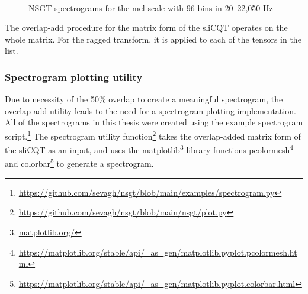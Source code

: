 \documentclass[report.tex]{subfiles}
\begin{document}
\begin{figure}[ht]
	\centering
	\\
	\caption{NSGT spectrograms for the mel scale with 96 bins in 20--22,050 Hz}
	\label{fig:overlappedspectrograms}
\end{figure}

The overlap-add procedure for the matrix form of the sliCQT operates on the whole matrix. For the ragged transform, it is applied to each of the tensors in the list.

\subsubsection{Spectrogram plotting utility}
\label{sec:slicqspec}

Due to necessity of the 50\% overlap to create a meaningful spectrogram, the overlap-add utility leads to the need for a spectrogram plotting implementation. All of the spectrograms in this thesis were created using the example spectrogram script.\footnote{\url{https://github.com/sevagh/nsgt/blob/main/examples/spectrogram.py}} The spectrogram utility function\footnote{\url{https://github.com/sevagh/nsgt/blob/main/nsgt/plot.py}} takes the overlap-added matrix form of the sliCQT as an input, and uses the matplotlib\footnote{\url{matplotlib.org/}} library functions pcolormesh\footnote{\url{https://matplotlib.org/stable/api/_as_gen/matplotlib.pyplot.pcolormesh.html}} and colorbar\footnote{\url{https://matplotlib.org/stable/api/_as_gen/matplotlib.pyplot.colorbar.html}} to generate a spectrogram.
\end{document}
